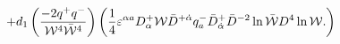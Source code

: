 \begin{equation}\label{j_part2}
+ d_1 \left({-2q^{+}q^{-}\over {\cal W}^4 \bar{\cal W}^4}\right)
\left( {1\over 4}\varepsilon^{\alpha a} D^{+}_{\alpha}{\cal
W}\bar{D}^{+\dot\alpha}q^{-}_{a}\bar{D}^{+}_{\dot\alpha}\bar{D}^{-2}
\ln \bar{\cal W} D^4 \ln {\cal W}. \right)
\end{equation}

